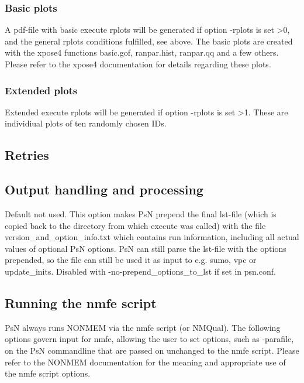 \subsubsection*{Basic plots}
A pdf-file with 
basic execute rplots will be generated if option -rplots is set >0,
and the general rplots conditions fulfilled, see above.
The basic plots are created with the xpose4 functions
basic.gof, ranpar.hist, ranpar.qq and a few others. Please
refer to the xpose4 documentation for details regarding these
plots.

\subsubsection*{Extended plots}
Extended execute rplots will be generated if option -rplots is set >1.
These are individiual plots of ten randomly chosen IDs.

\subsection{Retries}


\subsection{Output handling and processing}

\begin{optionlist}
Default not used. This option makes PsN prepend the final lst-file (which is copied back to the directory from which execute was called) with 
the file version\_and\_option\_info.txt which contains run information, including     all actual values of optional PsN options. PsN can still parse 
the lst-file with the options prepended, so the file can still be used it as input to e.g. sumo, vpc or update\_inits. Disabled with 
-no-prepend\_options\_to\_lst if set in psn.conf.
\nextopt
\end{optionlist}

\subsection{Running the nmfe script}
PsN always runs NONMEM via the nmfe script (or NMQual). 
The following options govern input for
nmfe, allowing the user to set options, such as \mbox{-parafile}, on the PsN commandline that
are passed on unchanged to the nmfe script.
Please refer to the NONMEM documentation for the meaning and appropriate use
of the nmfe script options.


